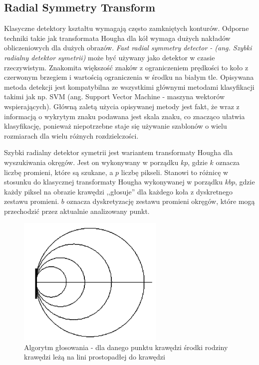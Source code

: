 \subsection{Radial Symmetry Transform}
Klasyczne detektory kształtu wymagają często zamkniętych konturów. Odporne techniki takie jak transformata Hougha dla kół wymaga dużych nakładów obliczeniowych dla dużych obrazów. \textit{Fast radial symmetry detector - (ang. Szybki radialny detektor symetrii)} może być używany jako detektor w czasie rzeczywistym. Znakomita większość znaków z ograniczeniem prędkości to koło z czerwonym brzegiem i wartością ograniczenia w środku na białym tle. Opisywana metoda detekcji jest kompatybilna ze wszystkimi głównymi metodami klasyfikacji takimi jak np. SVM (ang. Support Vector Machine - maszyna wektorów wspierających). Główną zaletą użycia opisywanej metody jest fakt, że wraz z informacją o wykrytym znaku podawana jest skala znaku, co znacząco ułatwia klasyfikację, ponieważ niepotrzebne staje się używanie szablonów o wielu rozmiarach dla wielu różnych rozdzielczości.

Szybki radialny detektor symetrii jest wariantem transformaty Hougha dla wyszukiwania okręgów. Jest on wykonywany w porządku $kp$, gdzie $k$ oznacza liczbę promieni, które są szukane, a $p$ liczbę pikseli. Stanowi to różnicę w stosunku do klasycznej transformaty Hougha wykonywanej w porządku $kbp$, gdzie każdy piksel na obrazie krawędzi ,,głosuje'' dla każdego koła z dyskretnego zestawu promieni. $b$ oznacza dyskretyzację zestawu promieni okręgów, które mogą przechodzić przez aktualnie analizowany punkt.

\begin{figure}
  \centering
  \includegraphics[width=7cm]{img/fsrd1.png}
  \caption{Algorytm głosowania - dla danego punktu krawędzi środki rodziny krawędzi leżą na lini prostopadłej do krawędzi\cite{T2}}
  \label{fig:frsd1}
\end{figure}

